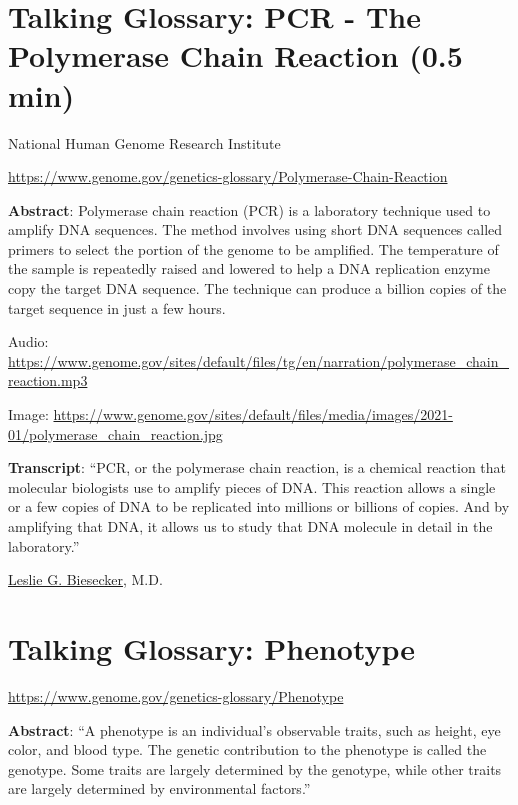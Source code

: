 \documentclass[
]{book}
\begin{document}
\hypertarget{talking-glossary-pcr---the-polymerase-chain-reaction-0.5-min}{%
\section{Talking Glossary: PCR - The Polymerase Chain Reaction (0.5 min)}\label{talking-glossary-pcr---the-polymerase-chain-reaction-0.5-min}}

National Human Genome Research Institute

\url{https://www.genome.gov/genetics-glossary/Polymerase-Chain-Reaction}

\textbf{Abstract}: Polymerase chain reaction (PCR) is a laboratory technique used to amplify DNA sequences. The method involves using short DNA sequences called primers to select the portion of the genome to be amplified. The temperature of the sample is repeatedly raised and lowered to help a DNA replication enzyme copy the target DNA sequence. The technique can produce a billion copies of the target sequence in just a few hours.

Audio: \url{https://www.genome.gov/sites/default/files/tg/en/narration/polymerase_chain_reaction.mp3}

Image: \url{https://www.genome.gov/sites/default/files/media/images/2021-01/polymerase_chain_reaction.jpg}

\textbf{Transcript}: ``PCR, or the polymerase chain reaction, is a chemical reaction that molecular biologists use to amplify pieces of DNA. This reaction allows a single or a few copies of DNA to be replicated into millions or billions of copies. And by amplifying that DNA, it allows us to study that DNA molecule in detail in the laboratory.''

\href{https://www.genome.gov/staff/Leslie-G-Biesecker-MD}{Leslie G. Biesecker}, M.D.

\hypertarget{talking-glossary-phenotype}{%
\section{Talking Glossary: Phenotype}\label{talking-glossary-phenotype}}

\url{https://www.genome.gov/genetics-glossary/Phenotype}

\textbf{Abstract}: ``A phenotype is an individual's observable traits, such as height, eye color, and blood type. The genetic contribution to the phenotype is called the genotype. Some traits are largely determined by the genotype, while other traits are largely determined by environmental factors.''
\end{document}
